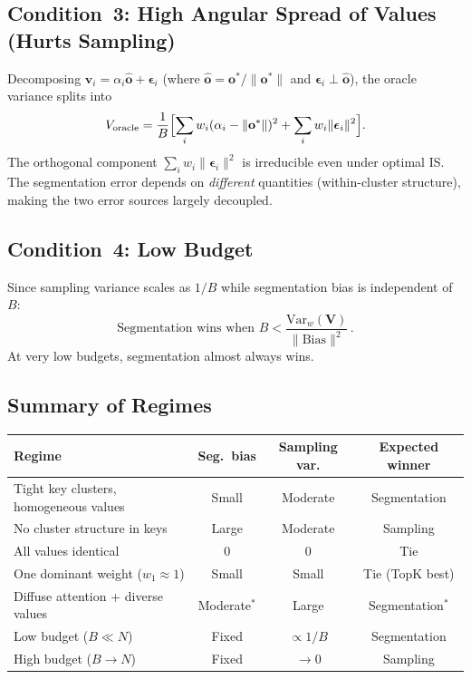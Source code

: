 \documentclass[11pt,a4paper]{article}
\theoremstyle{definition}
\newcommand{\vv}{\mathbf{v}}
\newcommand{\oo}{\mathbf{o}}
\newcommand{\beps}{\boldsymbol{\epsilon}}
\newcommand{\Var}{\mathrm{Var}}
\newcommand{\Bias}{\mathrm{Bias}}
\begin{document}
\subsection{Condition~3: High Angular Spread of Values (Hurts Sampling)}

Decomposing
$\vv_i = \alpha_i\hat{\oo} + \beps_i$
(where $\hat{\oo}=\oo^*/\|\oo^*\|$ and $\beps_i\perp\hat{\oo}$),
the oracle variance splits into
\[
  V_{\mathrm{oracle}}
  = \frac{1}{B}\Bigl[
    \sum_i w_i(\alpha_i-\|\oo^*\|)^2
    + \sum_i w_i\|\beps_i\|^2
  \Bigr].
\]
The orthogonal component $\sum_i w_i\|\beps_i\|^2$ is irreducible even under
optimal IS.  The segmentation error depends on \emph{different} quantities
(within-cluster structure), making the two error sources largely decoupled.

\subsection{Condition~4: Low Budget}

Since sampling variance scales as $1/B$ while segmentation bias is independent
of $B$:
\[
  \text{Segmentation wins when }
  B < \frac{\Var_w(\mathbf{V})}{\|\Bias\|^2}\,.
\]
At very low budgets, segmentation almost always wins.

\subsection{Summary of Regimes}

\begin{center}
\small
\begin{tabular}{lccc}
\toprule
\textbf{Regime} & \textbf{Seg.\ bias} & \textbf{Sampling var.} &
  \textbf{Expected winner}\\
\midrule
Tight key clusters, homogeneous values & Small & Moderate & Segmentation\\
No cluster structure in keys & Large & Moderate & Sampling\\
All values identical & $0$ & $0$ & Tie\\
One dominant weight ($w_1\!\approx\!1$) & Small & Small & Tie (TopK best)\\
Diffuse attention + diverse values & Moderate$^*$ & Large &
  Segmentation$^*$\\
Low budget ($B\ll N$) & Fixed & $\propto 1/B$ & Segmentation\\
High budget ($B\to N$) & Fixed & $\to 0$ & Sampling\\
\bottomrule
\end{tabular}
\end{center}
\end{document}
